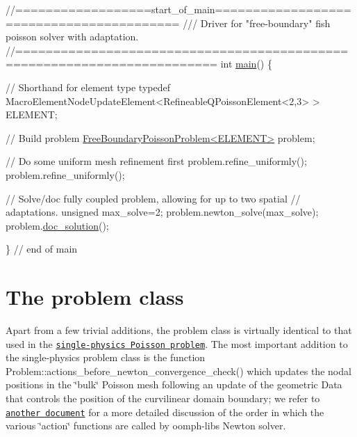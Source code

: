  
\begin{DoxyCodeInclude}
\textcolor{comment}{//==================start\_of\_main=========================================}
\textcolor{comment}{/// Driver for "free-boundary" fish poisson solver with adaptation.}
\textcolor{comment}{}\textcolor{comment}{//========================================================================}
\textcolor{keywordtype}{int} \hyperlink{algebraic__free__boundary__poisson_8cc_a0ddf1224851353fc92bfbff6f499fa97}{main}()
\{

 \textcolor{comment}{// Shorthand for element type}
 \textcolor{keyword}{typedef} MacroElementNodeUpdateElement<RefineableQPoissonElement<2,3> > 
  ELEMENT;

 \textcolor{comment}{// Build problem}
 \hyperlink{classFreeBoundaryPoissonProblem}{FreeBoundaryPoissonProblem<ELEMENT>} problem;

 \textcolor{comment}{// Do some uniform mesh refinement first}
 problem.refine\_uniformly();
 problem.refine\_uniformly();
 
 \textcolor{comment}{// Solve/doc fully coupled problem, allowing for up to two spatial}
 \textcolor{comment}{// adaptations. }
 \textcolor{keywordtype}{unsigned} max\_solve=2; 
 problem.newton\_solve(max\_solve);
 problem.\hyperlink{classFreeBoundaryPoissonProblem_a2282d8ac1d5753771a9a3cfc0417f6b6}{doc\_solution}();

\} \textcolor{comment}{// end of main}

\end{DoxyCodeInclude}




 

\hypertarget{index_problem}{}\section{The problem class}\label{index_problem}
Apart from a few trivial additions, the problem class is virtually identical to that used in the \href{../../../poisson/fish_poisson/html/index.html}{\tt single-\/physics Poisson problem}. The most important addition to the single-\/physics problem class is the function {\ttfamily Problem\+::actions\+\_\+before\+\_\+newton\+\_\+convergence\+\_\+check()} which updates the nodal positions in the \char`\"{}bulk\char`\"{} Poisson mesh following an update of the geometric {\ttfamily Data} that controls the position of the curvilinear domain boundary; we refer to \href{../../../order_of_action_functions/html/index.html}{\tt another document} for a more detailed discussion of the order in which the various \char`\"{}action\char`\"{} functions are called by {\ttfamily oomph-\/lib\textquotesingle{}s} Newton solver.

